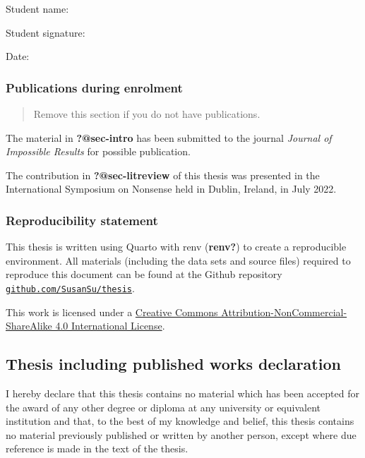 \documentclass[
  11pt,
  a4paper,
]{report}
\begin{document}
Student name:

Student signature:

Date:

\subsubsection*{Publications during
enrolment}\label{publications-during-enrolment}

\begin{quote}
Remove this section if you do not have publications.
\end{quote}

The material in \textbf{?@sec-intro} has been submitted to the journal
\emph{Journal of Impossible Results} for possible publication.

The contribution in \textbf{?@sec-litreview} of this thesis was
presented in the International Symposium on Nonsense held in Dublin,
Ireland, in July 2022.

\subsubsection*{Reproducibility
statement}\label{reproducibility-statement}

This thesis is written using Quarto with renv (\textbf{renv?}) to create
a reproducible environment. All materials (including the data sets and
source files) required to reproduce this document can be found at the
Github repository
\href{https://github.com/SusanSu/thesis}{\texttt{github.com/SusanSu/thesis}}.

This work is licensed under a
\href{http://creativecommons.org/licenses/by-nc-sa/4.0/}{Creative
Commons Attribution-NonCommercial-ShareAlike 4.0 International License}.

\subsection*{Thesis including published works
declaration}\label{thesis-including-published-works-declaration}

I hereby declare that this thesis contains no material which has been
accepted for the award of any other degree or diploma at any university
or equivalent institution and that, to the best of my knowledge and
belief, this thesis contains no material previously published or written
by another person, except where due reference is made in the text of the
thesis.
\end{document}
